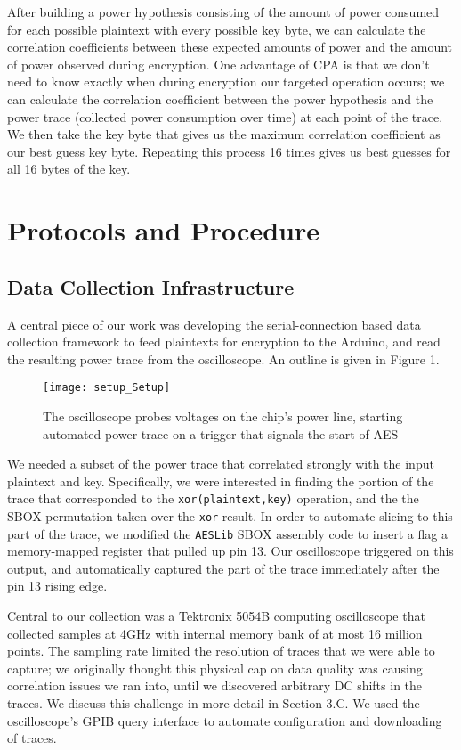 \documentclass[journal]{ieee_style}
\begin{document}
After building a power hypothesis consisting of the amount of power consumed for each possible plaintext with every possible key byte, we can calculate the correlation coefficients between these expected amounts of power and the amount of power observed during encryption. One advantage of CPA is that we don't need to know exactly when during encryption our targeted operation occurs; we can calculate the correlation coefficient between the power hypothesis and the power trace (collected power consumption over time) at each point of the trace. We then take the key byte that gives us the maximum correlation coefficient as our best guess key byte. Repeating this process 16 times gives us best guesses for all 16 bytes of the key.


\section{Protocols and Procedure}
\subsection{Data Collection Infrastructure}
A central piece of our work was developing the serial-connection based data collection framework to feed plaintexts for encryption to the Arduino, and read the resulting power trace from the oscilloscope. An outline is given in Figure 1.

\begin{figure}[!t]
\centering
\texttt{[image: setup\_Setup]}
\caption{The oscilloscope probes voltages on the chip's power line, starting automated power trace on a trigger that signals the start of AES}
\label{fig_sim}
\end{figure}

We needed a subset of the power trace that correlated strongly with the input plaintext and key. Specifically, we were interested in finding the portion of the trace that corresponded to the \texttt{xor(plaintext,key)} operation, and the the SBOX permutation taken over the \texttt{xor} result. In order to automate slicing to this part of the trace, we modified the \texttt{AESLib} SBOX assembly code to insert a flag a memory-mapped register that pulled up pin 13. Our oscilloscope triggered on this output, and automatically captured the part of the trace immediately after the pin 13 rising edge. 

Central to our collection was a Tektronix 5054B computing oscilloscope that collected samples at 4GHz with internal memory bank of at most 16 million points. The sampling rate limited the resolution of traces that we were able to capture; we originally thought this physical cap on data quality was causing correlation issues we ran into, until we discovered arbitrary DC shifts in the traces. We discuss this challenge in more detail in Section 3.C. We used the oscilloscope's GPIB query interface to automate configuration and downloading of traces.
\end{document}
